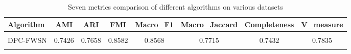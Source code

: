 \begin{table}[ht!]
\centering
\caption{Seven metrics comparison of different algorithms on various datasets}
\label{tab:dataset_metrics_7metrics}
\footnotesize
\begin{tabular*}{\linewidth}{@{} lccccccc @{}}
\toprule
Algorithm & AMI & ARI & FMI & Macro_F1 & Macro_Jaccard & Completeness & V_measure \\
\midrule
\addlinespace
\multicolumn{8}{l}{\textbf{3c}} \\
DPC-FWSN & 0.7426 & 0.7658 & 0.8582 & 0.8568 & 0.7715 & 0.7432 & 0.7835 \\
\addlinespace
\bottomrule
\end{tabular*}
\end{table}